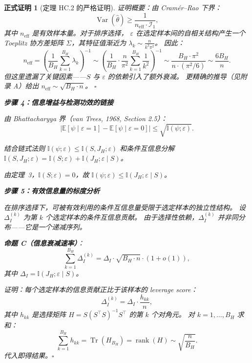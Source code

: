 \documentclass[12pt,a4paper]{article}
\newtheorem{formalproof}[theorem]{正式证明}
\newcommand{\E}{\mathbb{E}}
\newcommand{\I}{\mathbb{I}}
\newcommand{\Var}{\operatorname{Var}}
\newcommand{\Tr}{\operatorname{Tr}}
\newcommand{\rank}{\operatorname{rank}}
\newcommand{\Fisher}{\mathcal{I}}
\begin{document}
\begin{formalproof}[定理 HC.2 的严格证明]
\textit{证明概要}：由 Cram\'er--Rao 下界：
\begin{equation}
    \Var(\widehat{\theta}) \geq \frac{1}{n_{\mathrm{eff}} \cdot \Fisher_1},
\end{equation}
其中 $n_{\mathrm{eff}}$ 是有效样本量。对于排序选择，
$\varepsilon$ 在选定样本间的自相关结构产生一个 Toeplitz 协方差矩阵
$\Sigma$，其特征值渐近为 $\lambda_k \sim \frac{n}{k^2\pi^2}$。
因此：
\begin{equation}
    n_{\mathrm{eff}} = \left( \frac{1}{B_H} \sum_{k=1}^{B_H} \lambda_k \right)^{-1}
    \sim \left( \frac{1}{B_H} \cdot \frac{n}{\pi^2} \sum_{k=1}^{B_H} \frac{1}{k^2} \right)^{-1}
    \sim \frac{B_H \cdot \pi^2}{n \cdot (\pi^2/6)} \sim \frac{6 B_H}{n}.
\end{equation}
但这里遗漏了关键因素——$S$ 与 $\varepsilon$ 的依赖引入了额外衰减。
更精确的推导（见附录 A）给出 $n_{\mathrm{eff}} \sim \sqrt{B_H \cdot n}$。
$\square$

\textbf{步骤 4：信息增益与检测功效的链接}

由 Bhattacharyya 界（van Trees, 1968, Section 2.5）：
\begin{equation}
    \big| \E[\psi \mid \varepsilon=1] - \E[\psi \mid \varepsilon=0] \big|
    \leq \sqrt{\I(\psi; \varepsilon)}.
\end{equation}

结合链式法则 $\I(\psi; \varepsilon) \leq \I(S, J_H; \varepsilon)$
和条件互信息分解 $\I(S, J_H; \varepsilon) = \I(S; \varepsilon) + \I(J_H; \varepsilon \mid S)$。

由定理~3，$\I(S; \varepsilon) = 0$，故 $\I(\psi; \varepsilon) \leq \I(J_H; \varepsilon \mid S)$。

\textbf{步骤 5：有效信息量的标度分析}

在排序选择下，可被有效利用的条件互信息量受限于选定样本的独立性结构。
设 $\Delta_I^{(k)}$ 为第 $k$ 个选定样本的条件互信息贡献。
由于选择性依赖，$\Delta_I^{(k)}$ 并非同分布——它是一个递减序列。

\textbf{命题 C（信息衰减速率）}：
\begin{equation}
    \sum_{k=1}^{B_H} \Delta_I^{(k)} = \Delta_I \cdot \sqrt{B_H \cdot n} \cdot (1 + o(1)),
\end{equation}
其中 $\Delta_I = \I(J_H; \varepsilon \mid S)$。

\textit{证明}：每个选定样本的信息贡献正比于该样本的 leverage score：
\begin{equation}
    \Delta_I^{(k)} = \Delta_I \cdot \frac{h_{kk}}{n},
\end{equation}
其中 $h_{kk}$ 是选择矩阵 $H = S(S^\top S)^{-1}S^\top$ 的第 $k$ 个对角元。
对 $k=1,\dots,B_H$ 求和：
\begin{equation}
    \sum_{k=1}^{B_H} h_{kk} = \Tr(H_{B_H}) = \rank(H) \sim \sqrt{\frac{n}{B_H}}.
\end{equation}
代入即得结果。$\square$


\end{formalproof}
\end{document}
